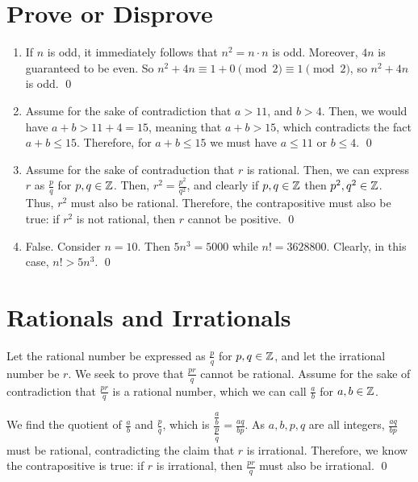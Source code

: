 \documentclass{article}
\begin{document}
\section{Prove or Disprove}
\begin{enumerate}[label=\alph*.]
	\item If $n$ is odd, it immediately follows that $n^2 = n \cdot n$ is odd. Moreover, $4n$ is 
	guaranteed to be even. So $n^2 + 4n \equiv 1 + 0 \pmod 2 \equiv 1 \pmod 2$, so $n^2+4n$ is odd.
	\qed
	\item Assume for the sake of contradiction that $a > 11$, and $b > 4$. Then, we would have
	$a+b > 11+4 = 15$, meaning that $a+b > 15$, which contradicts the fact $a+b \leq 15$. Therefore,
	for $a+b \leq 15$ we must have $a \leq 11$ or $b \leq 4$. \qed
	\item Assume for the sake of contraduction that $r$ is rational. Then, we can express $r$ as 
	$\frac{p}{q}$ for $p, q \in \mathbb Z$. Then, $r^2 = \frac{p^2}{q^2}$, and clearly if $p, q \in \mathbb Z$
	then $p^2, q^2 \in \mathbb Z$. Thus, $r^2$ must also be rational. Therefore, the contrapositive must also 
	be true: if $r^2$ is not rational, then $r$ cannot be positive. \qed
	\item False. Consider $n = 10$. Then $5n^3 = 5000$ while $n! = 3628800$. Clearly, in this case,
	$n! > 5n^3$. \qed
\end{enumerate}

\section{Rationals and Irrationals}

Let the rational number be expressed as $\frac{p}{q}$ for $p, q \in \mathbb Z$, 
and let the irrational number be $r$.
We seek to prove that $\frac{pr}{q}$ cannot be rational. Assume for the sake of contradiction 
that $\frac{pr}{q}$ is a rational number, which we can call $\frac{a}{b}$ for $a, b \in \mathbb Z$.

We find the quotient of $\frac{a}{b}$ and $\frac{p}{q}$, which is $\dfrac{\frac{a}{b}}{\frac{p}{q}} = 
\frac{aq}{bp}$. As $a, b, p, q$ are all integers, $\frac{aq}{bp}$ must be rational, contradicting the 
claim that $r$ is irrational. Therefore, we know the contrapositive is true: 
if $r$ is irrational, then $\frac{pr}{q}$ must also be irrational. \qed
\end{document}
